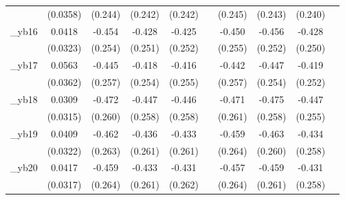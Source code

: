 \begin{table}[htbp]
\begin{tabular}{l*{9}{c}}
            &    (0.0358)         &     (0.244)         &     (0.242)         &     (0.242)         &                     &     (0.245)         &     (0.243)         &     (0.240)         &                     \\
[1em]
\_yb16       &      0.0418         &      -0.454\sym{*}  &      -0.428\sym{*}  &      -0.425\sym{*}  &                     &      -0.450\sym{*}  &      -0.456\sym{*}  &      -0.428\sym{*}  &                     \\
            &    (0.0323)         &     (0.254)         &     (0.251)         &     (0.252)         &                     &     (0.255)         &     (0.252)         &     (0.250)         &                     \\
[1em]
\_yb17       &      0.0563         &      -0.445\sym{*}  &      -0.418\sym{*}  &      -0.416         &                     &      -0.442\sym{*}  &      -0.447\sym{*}  &      -0.419\sym{*}  &                     \\
            &    (0.0362)         &     (0.257)         &     (0.254)         &     (0.255)         &                     &     (0.257)         &     (0.254)         &     (0.252)         &                     \\
[1em]
\_yb18       &      0.0309         &      -0.472\sym{*}  &      -0.447\sym{*}  &      -0.446\sym{*}  &                     &      -0.471\sym{*}  &      -0.475\sym{*}  &      -0.447\sym{*}  &                     \\
            &    (0.0315)         &     (0.260)         &     (0.258)         &     (0.258)         &                     &     (0.261)         &     (0.258)         &     (0.255)         &                     \\
[1em]
\_yb19       &      0.0409         &      -0.462\sym{*}  &      -0.436\sym{*}  &      -0.433\sym{*}  &                     &      -0.459\sym{*}  &      -0.463\sym{*}  &      -0.434\sym{*}  &                     \\
            &    (0.0322)         &     (0.263)         &     (0.261)         &     (0.261)         &                     &     (0.264)         &     (0.260)         &     (0.258)         &                     \\
[1em]
\_yb20       &      0.0417         &      -0.459\sym{*}  &      -0.433\sym{*}  &      -0.431\sym{*}  &                     &      -0.457\sym{*}  &      -0.459\sym{*}  &      -0.431\sym{*}  &                     \\
            &    (0.0317)         &     (0.264)         &     (0.261)         &     (0.262)         &                     &     (0.264)         &     (0.261)         &     (0.258)         &                     \\

\end{tabular}
\end{table}
